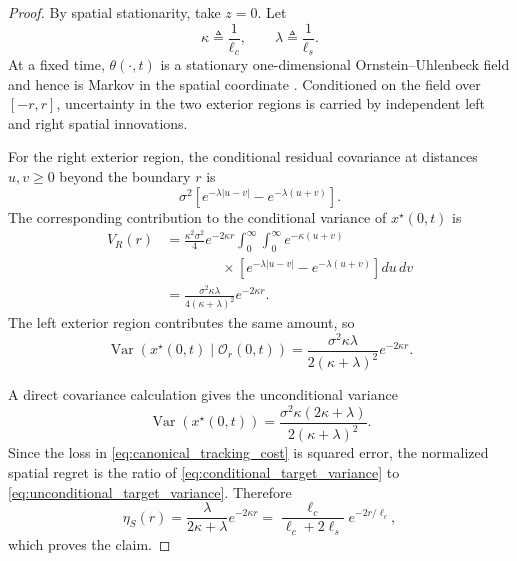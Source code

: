 \documentclass[11pt]{article}
\begin{document}
\begin{proof}
By spatial stationarity, take $z=0$. Let
\begin{equation}
    \kappa
    \triangleq
    \frac{1}{\ell_c},
    \qquad
    \lambda
    \triangleq
    \frac{1}{\ell_s}.
    \label{eq:kappa_lambda}
\end{equation}
At a fixed time, $\theta(\cdot,t)$ is a stationary one-dimensional
Ornstein--Uhlenbeck field and hence is Markov in the spatial coordinate
\cite{lindgren2011explicit}.
Conditioned on the field over $[-r,r]$, uncertainty in the two exterior
regions is carried by independent left and right spatial innovations.

For the right exterior region, the conditional residual covariance at
distances $u,v\ge0$ beyond the boundary $r$ is
\begin{equation}
    \sigma^2
    \left[
        e^{-\lambda|u-v|}
        -
        e^{-\lambda(u+v)}
    \right].
    \label{eq:OU_tail_conditional_covariance}
\end{equation}
The corresponding contribution to the conditional variance of
$x^\star(0,t)$ is
\begin{align}
    V_R(r)
    &=
    \frac{
        \kappa^2\sigma^2
    }{4}
    e^{-2\kappa r}
    \int_0^\infty
    \int_0^\infty
    e^{-\kappa(u+v)}
    \nonumber\\
    &\qquad\qquad\times
    \left[
        e^{-\lambda|u-v|}
        -
        e^{-\lambda(u+v)}
    \right]
    du\,dv
    \nonumber\\
    &=
    \frac{
        \sigma^2\kappa\lambda
    }{
        4(\kappa+\lambda)^2
    }
    e^{-2\kappa r}.
    \label{eq:right_tail_variance}
\end{align}
The left exterior region contributes the same amount, so
\begin{equation}
    \operatorname{Var}
    \left(
        x^\star(0,t)
        \mid
        \mathcal{O}_r(0,t)
    \right)
    =
    \frac{
        \sigma^2\kappa\lambda
    }{
        2(\kappa+\lambda)^2
    }
    e^{-2\kappa r}.
    \label{eq:conditional_target_variance}
\end{equation}

A direct covariance calculation gives the unconditional variance
\begin{equation}
    \operatorname{Var}
    \left(
        x^\star(0,t)
    \right)
    =
    \frac{
        \sigma^2\kappa
        \left(
            2\kappa+\lambda
        \right)
    }{
        2(\kappa+\lambda)^2
    }.
    \label{eq:unconditional_target_variance}
\end{equation}
Since the loss in \eqref{eq:canonical_tracking_cost} is squared error, the
normalized spatial regret is the ratio of
\eqref{eq:conditional_target_variance} to
\eqref{eq:unconditional_target_variance}. Therefore
\begin{equation}
    \eta_S(r)
    =
    \frac{
        \lambda
    }{
        2\kappa+\lambda
    }
    e^{-2\kappa r}
    =
    \frac{
        \ell_c
    }{
        \ell_c+2\ell_s
    }
    e^{-2r/\ell_c},
\end{equation}
which proves the claim.
\end{proof}
\end{document}
